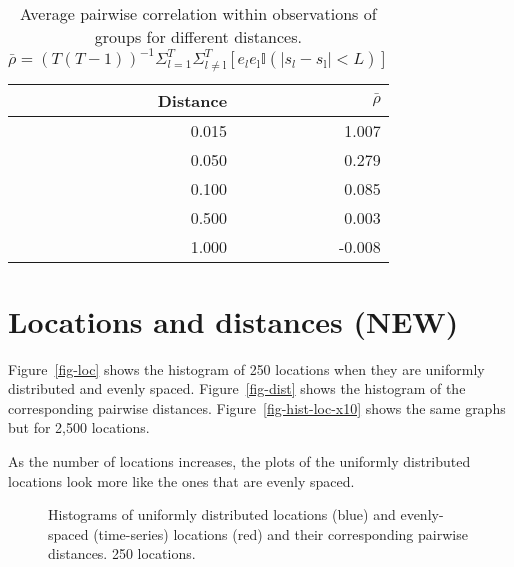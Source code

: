 \documentclass[
]{article}
\begin{document}
\hypertarget{tbl-rho-bar-ar1}{}
\begin{table}
\caption{\label{tbl-rho-bar-ar1}Average pairwise correlation within observations of groups for different
distances.
\(\bar\rho=(T(T-1))^{-1}\Sigma_{l=1}^T\Sigma_{l\not=\text{l}}^T[e_le_{\text{l}}\mathbb{I}(|s_l-s_{\text{l}}|<L)]\) }\tabularnewline

\centering
\begin{tabular}[t]{rr}
\toprule
Distance & $\bar\rho$\\
\midrule
0.015 & 1.007\\
0.050 & 0.279\\
0.100 & 0.085\\
0.500 & 0.003\\
1.000 & -0.008\\
\bottomrule
\end{tabular}
\end{table}

\hypertarget{locations-and-distances-new}{%
\section{Locations and distances
(NEW)}\label{locations-and-distances-new}}

Figure~\ref{fig-loc} shows the histogram of 250 locations when they are
uniformly distributed and evenly spaced. Figure~\ref{fig-dist} shows the
histogram of the corresponding pairwise distances.
Figure~\ref{fig-hist-loc-x10} shows the same graphs but for 2,500
locations.

As the number of locations increases, the plots of the uniformly
distributed locations look more like the ones that are evenly spaced.

\begin{figure}

\begin{minipage}[t]{\linewidth}

{\centering 


}

\end{minipage}%
\newline
\begin{minipage}[t]{\linewidth}

{\centering 


}

\end{minipage}%

\caption{\label{fig-hist-loc}Histograms of uniformly distributed
locations (blue) and evenly-spaced (time-series) locations (red) and
their corresponding pairwise distances. 250 locations.}

\end{figure}
\end{document}
